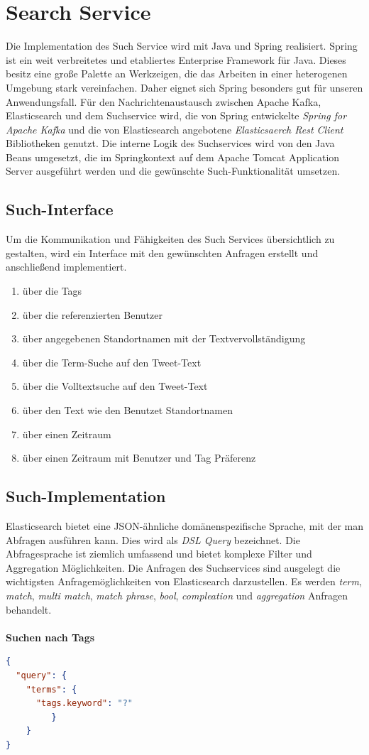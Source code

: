 \section{Search Service}
Die Implementation des Such Service wird mit Java und Spring realisiert. Spring ist ein weit verbreitetes und etabliertes Enterprise Framework für Java. Dieses besitz eine große Palette an Werkzeigen, die das Arbeiten in einer heterogenen Umgebung stark vereinfachen. Daher eignet sich Spring besonders gut für unseren Anwendungsfall. Für den Nachrichtenaustausch zwischen Apache Kafka, Elasticsearch und dem Suchservice wird, die von Spring entwickelte \textit{Spring for Apache Kafka} und die von Elasticsearch angebotene \textit{Elasticsaerch Rest Client} Bibliotheken genutzt.
Die interne Logik des Suchservices wird von den Java Beans umgesetzt, die im Springkontext auf dem Apache Tomcat Application Server ausgeführt werden und die gewünschte Such-Funktionalität umsetzen.

\subsection{Such-Interface}
Um die Kommunikation und Fähigkeiten des Such Services übersichtlich zu gestalten, wird ein Interface mit den gewünschten Anfragen erstellt und anschließend implementiert. 

\begin{enumerate}
  \item über die Tags
  \item über die referenzierten Benutzer
  \item über angegebenen Standortnamen mit der Textvervollständigung
  \item über die Term-Suche auf den Tweet-Text
  \item über die Volltextsuche auf den Tweet-Text
  \item über den Text wie den Benutzet Standortnamen
  \item über einen Zeitraum
  \item über einen Zeitraum mit Benutzer und Tag Präferenz 
\end{enumerate}

\subsection{Such-Implementation}
Elasticsearch bietet eine JSON-ähnliche domänenspezifische Sprache, mit der man Abfragen ausführen kann. Dies wird als \textit{DSL Query} bezeichnet. Die Abfragesprache ist ziemlich umfassend und bietet komplexe Filter und Aggregation Möglichkeiten. Die Anfragen des Suchservices sind ausgelegt die wichtigsten Anfragemöglichkeiten von Elasticsearch darzustellen. Es werden \textit{term}, \textit{match}, \textit{multi match}, \textit{match phrase}, \textit{bool}, \textit{compleation} und \textit{aggregation} Anfragen behandelt. 
\\\\
\textbf{Suchen nach Tags}
\begin{lstlisting}[language=json,firstnumber=1]
{
  "query": {
    "terms": {
      "tags.keyword": "?"
         }
    }
}
\end{lstlisting}

